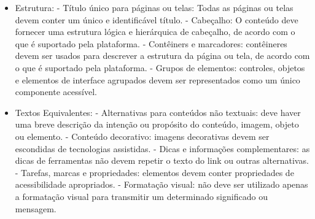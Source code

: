\begin{itemize}
	\item Estrutura:
		\subitem - Título único	para páginas ou telas: Todas as páginas ou telas devem conter um único e identificável título.
		\subitem - Cabeçalho: O conteúdo deve fornecer uma estrutura lógica e hierárquica de cabeçalho, de acordo com o que é suportado pela plataforma.
		\subitem - Contêiners e marcadores: contêineres devem ser usados para descrever a estrutura da página ou tela, de acordo com o que é suportado pela plataforma.
		\subitem - Grupos de elementos: controles, objetos e elementos de interface agrupados devem ser representados como um único componente acessível.
	\item Textos Equivalentes:
		\subitem - Alternativas para conteúdos não textuais: deve haver uma breve descrição da intenção ou propósito do conteúdo, imagem, objeto ou elemento.
		\subitem - Conteúdo decorativo: imagens decorativas devem ser escondidas de tecnologias assistidas.
		\subitem - Dicas e informações complementares: as dicas de ferramentas não devem repetir o texto do link ou outras alternativas.
		\subitem - Tarefas, marcas e propriedades: elementos devem conter propriedades de acessibilidade apropriados.
		\subitem - Formatação visual: não deve ser utilizado apenas a formatação visual para transmitir um determinado significado ou mensagem.
\end{itemize}

